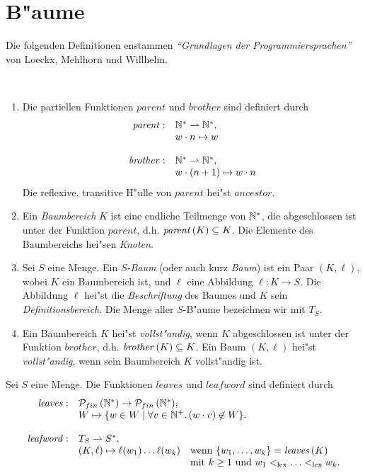 \documentclass[12pt,a4paper]{article}
\begin{document}
\section{B"aume}

Die folgenden Definitionen enstammen \emph{``Grundlagen der Programmiersprachen''} von Loeckx, Mehlhorn
und Willhelm.
\begin{definition} \
  \begin{enumerate}
  \item Die partiellen Funktionen $\mathit{parent}$ und $\mathit{brother}$ sind definiert durch
    \[\begin{array}{rl}
      \mathit{parent}: & \mathbb N^* \rightharpoonup \mathbb N^*, \\
      & w \cdot n \mapsto w \\
      \\
      \mathit{brother}: & \mathbb N^* \rightharpoonup \mathbb N^*, \\
      & w \cdot (n+1) \mapsto w \cdot n \\
    \end{array}\]
    Die reflexive, transitive H"ulle von $\mathit{parent}$ hei"st $\mathit{ancestor}$.
  \item Ein \emph{Baumbereich} $K$ ist eine endliche Teilmenge von $\mathbb N^*$, die abgeschlossen
    ist unter der Funktion $\mathit{parent}$, d.h. $\mathit{parent}\,(K) \subseteq K$. Die Elemente des
    Baumbereichs hei"sen \emph{Knoten}.
  \item Sei $S$ eine Menge. Ein \emph{$S$-Baum} (oder auch kurz \emph{Baum}) ist ein Paar
    $(K,\ell)$, wobei $K$ ein Baumbereich ist, und $\ell$ eine Abbildung $\ell:K \to S$. Die
    Abbildung $\ell$ hei"st die \emph{Beschriftung} des Baumes und $K$ sein \emph{Definitionsbereich}.
    Die Menge aller $S$-B"aume bezeichnen wir mit $T_S$.
  \item Ein Baumbereich $K$ hei"st \emph{vollst"andig}, wenn $K$ abgeschlossen ist unter der
    Funktion $\mathit{brother}$, d.h. $\mathit{brother}\,(K) \subseteq K$. Ein Baum $(K,\ell)$ hei"st
    \emph{vollst"andig}, wenn sein Baumbereich $K$ vollst"andig ist.
  \end{enumerate}
\end{definition}

\begin{definition}
  Sei $S$ eine Menge. Die Funktionen $\mathit{leaves}$ und $\mathit{leafword}$ sind definiert durch
  \[\begin{array}{rll}
    \mathit{leaves}: & \powersetfin{\N^*} \to \powersetfin{\N^*}, \\
    & \multicolumn{2}{l}{W \mapsto \{w \in W \mid \forall v \in \N^+.\,(w \cdot v) \not\in W\}.} \\
    \\
    \mathit{leafword}: & T_S \pto S^*, \\
    & (K,\ell) \mapsto \ell(w_1)\ldots\ell(w_k) & \text{wenn $\{w_1,\ldots,w_k\}=\leaves{K}$} \\
    && \text{mit $k \ge 1$ und $w_1 <_{\text{lex}} \ldots <_{\text{lex}} w_k$.} \\
    \end{array}\]
\end{definition}
\end{document}
